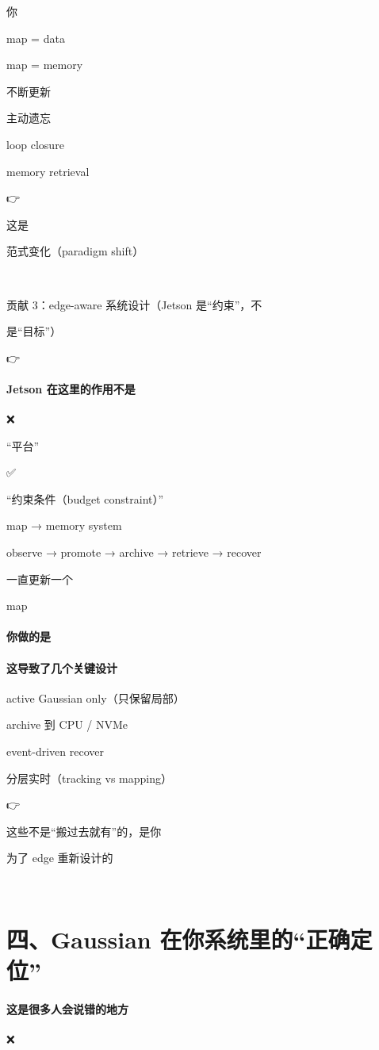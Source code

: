 \documentclass[12pt]{article}
\begin{document}
你

map = data

map = memory

不断更新

主动遗忘

loop closure

memory retrieval

👉

这是

范式变化（paradigm shift）

🥉

贡献 3：edge-aware 系统设计（Jetson 是“约束”，不

是“目标”）

👉

\paragraph{Jetson 在这里的作用不是}
❌

“平台”

✅

“约束条件（budget constraint）”

map → memory system

observe → promote → archive → retrieve → recover

⼀直更新⼀个

map

\paragraph{你做的是}
\paragraph{这导致了几个关键设计}
active Gaussian only（只保留局部）

archive 到 CPU / NVMe

event-driven recover

分层实时（tracking vs mapping）

👉

这些不是“搬过去就有”的，是你

为了 edge 重新设计的

🧠

\section{四、Gaussian 在你系统里的“正确定位”}
\paragraph{这是很多人会说错的地方}
❌
\end{document}
